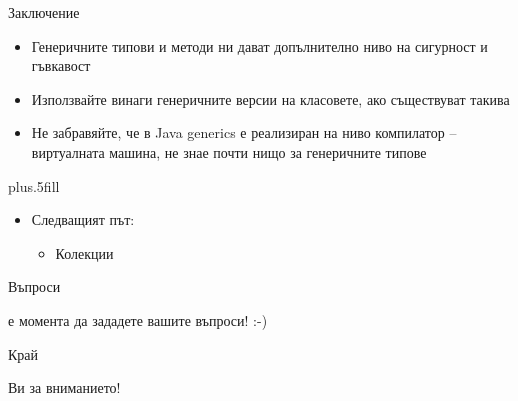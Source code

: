 \documentclass{beamer}
\begin{document}
\begin{frame}{Заключение}
  \transdissolve
  \begin{itemize}
  \item Генеричните типови и методи ни дават
    допълнително ниво на сигурност и
    гъвкавост
   \item Използвайте винаги генеричните версии
    на класовете, ако съществуват такива
   \item Не забравяйте, че в Java generics е
    реализиран на ниво компилатор –
    виртуалната машина, не знае почти
    нищо за генеричните типове
  \end{itemize}
  
  \vskip0pt plus.5fill
  \begin{itemize}
  \item
    Следващият път:
    \begin{itemize}
    \item
      Колекции
    \end{itemize}
  \end{itemize}
\end{frame}

\begin{frame}{Въпроси}
  \transdissolve
  \begin{center}
     е момента да зададете вашите въпроси! :-)
  \end{center}
\end{frame}

\begin{frame}{Край}
  \transdissolve
  \begin{center}
     Ви за вниманието!
  \end{center}
\end{frame}
\end{document}
